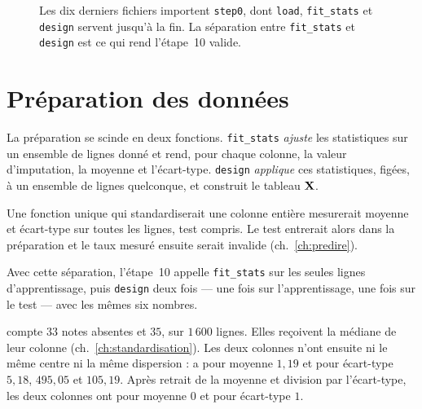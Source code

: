 \begin{figure}[htbp]
\begin{graphique}
\end{graphique}
\caption{Les dix derniers fichiers importent \texttt{step0}, dont \texttt{load},
\texttt{fit\_stats} et \texttt{design} servent jusqu'à la fin. La séparation
entre \texttt{fit\_stats} et \texttt{design} est ce qui rend l'étape~10 valide.}
\label{fig:montage}
\end{figure}
\FloatBarrier

\section{Préparation des données}

La préparation se scinde en deux fonctions. \texttt{fit\_stats} \emph{ajuste} les
statistiques sur un ensemble de lignes donné et rend, pour chaque colonne, la
valeur d'imputation, la moyenne et l'écart-type. \texttt{design} \emph{applique}
ces statistiques, figées, à un ensemble de lignes quelconque, et construit le
tableau $\mathbf{X}$.

\begin{vigilance}
Une fonction unique qui standardiserait une colonne entière mesurerait moyenne et
écart-type sur toutes les lignes, test compris. Le test entrerait alors dans la
préparation et le taux mesuré ensuite serait invalide (ch.~\ref{ch:predire}).

Avec cette séparation, l'étape~10 appelle \texttt{fit\_stats} sur les seules
lignes d'apprentissage, puis \texttt{design} deux fois --- une fois sur
l'apprentissage, une fois sur le test --- avec les mêmes six nombres.
\end{vigilance}

\Herb compte $33$ notes absentes et \Runes $35$, sur $1\,600$ lignes. Elles
reçoivent la médiane de leur colonne (ch.~\ref{ch:standardisation}). Les deux
colonnes n'ont ensuite ni le même centre ni la même dispersion : \Herb a pour
moyenne $1{,}19$ et pour écart-type $5{,}18$, \Runes $495{,}05$ et $105{,}19$.
Après retrait de la moyenne et division par l'écart-type, les deux colonnes ont
pour moyenne $0$ et pour écart-type $1$.

